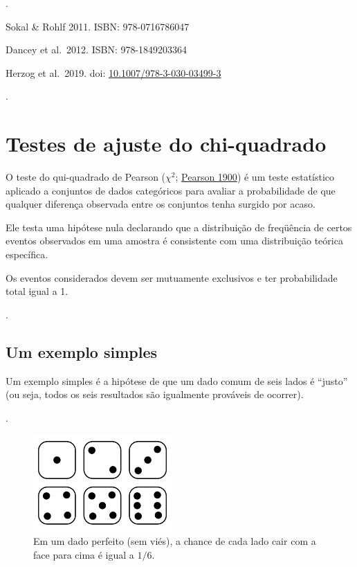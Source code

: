 \documentclass[
]{book}
\begin{document}
.\linebreak

Sokal \& Rohlf 2011. ISBN: 978-0716786047

Dancey et al.~2012. ISBN: 978-1849203364

Herzog et al.~2019. doi: \href{https://doi.org/10.1007/978-3-030-03499-3}{10.1007/978-3-030-03499-3}

.\linebreak

\hypertarget{testes-de-ajuste-do-chi-quadrado}{%
\section{Testes de ajuste do chi-quadrado}\label{testes-de-ajuste-do-chi-quadrado}}

O teste do qui-quadrado de Pearson (\(χ^2\); \href{https://doi.org/10.1080/14786440009463897}{Pearson 1900}) é um teste estatístico aplicado a conjuntos de dados categóricos para avaliar a probabilidade de que qualquer diferença observada entre os conjuntos tenha surgido por acaso.

Ele testa uma hipótese nula declarando que a distribuição de freqüência de certos eventos observados em uma amostra é consistente com uma distribuição teórica específica.

Os eventos considerados devem ser mutuamente exclusivos e ter probabilidade total igual a 1.

.\linebreak

\hypertarget{um-exemplo-simples}{%
\subsection{Um exemplo simples}\label{um-exemplo-simples}}

Um exemplo simples é a hipótese de que um dado comum de seis lados é ``justo'' (ou seja, todos os seis resultados são igualmente prováveis de ocorrer).

.\linebreak

\begin{figure}

{\centering \includegraphics[width=200px]{figs/dice} 

}

\caption{Em um dado perfeito (sem viés), a chance de cada lado cair com a face para cima é igual a $1/6$.}\label{fig:dados}
\end{figure}
\end{document}
